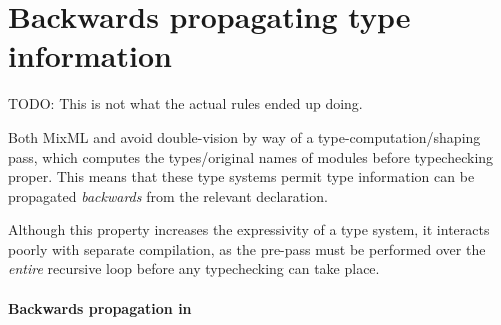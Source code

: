 \section{Backwards propagating type information}

TODO: This is not what the actual rules ended up doing.

Both MixML and \OldBackpack{} avoid double-vision by way of a
type-computation/shaping pass, which computes the types/original names
of modules before typechecking proper.  This means that these
type systems permit type information can be propagated \emph{backwards}
from the relevant declaration.

Although this property increases the expressivity of a type
system, it interacts poorly with separate compilation, as the
pre-pass must be performed over the \emph{entire} recursive loop
before any typechecking can take place.

\iffalse%
\paragraph{Backwards propagation in MixML}  Consider the following
example:

\begin{figure}[H]
\begin{tabular}{p{0.40\textwidth} p{0.50\textwidth}}
\begin{lstlisting}[language=ML,escapechar=@]
{ type t,
  val f : t -> t,
  val x = f 2 }
    with
{ type t = int }
\end{lstlisting}
&
\begin{verbatim}
(* mixml 0.2.1 passes with type: *)
it : {f : [int -> int]-,
      t : [= int : #], x : [int]+}
\end{verbatim}
\end{tabular}
\caption{Backwards propagating type information in MixML}
\label{fig:double-vision-backwards-propagating-mixml}
\end{figure}

\noindent
In this example, a module which ordinarily would not typecheck
(there is no reason to believe \verb|t = int|) is mixin linked
with a second module, which introduces the necessary type equality
for \verb|f 2| to typecheck.  We think this is a bit \emph{unusual}.

\Red{But does MixML actually behave this way, or is it an
implementation bug? Point out that the suggested encoding for signature
refinement is not upheld faithfully here.}
\fi
\paragraph{Backwards propagation in \OldBackpack{}}

